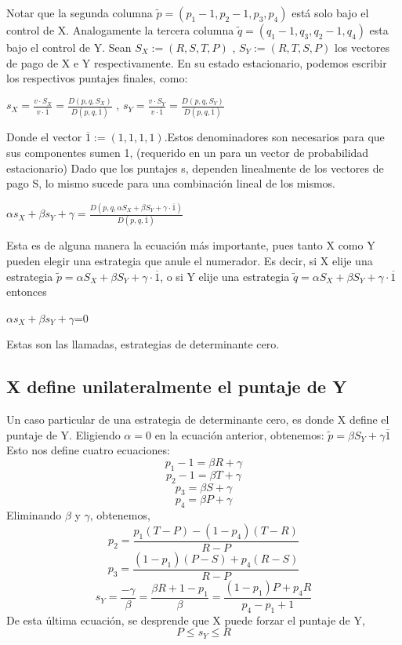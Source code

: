 \documentclass[12pt]{article}
\begin{document}
Notar que la segunda columna $\tilde{p}= (p_1-1,p_2-1,p_3,p_4)$ está solo bajo el control de X.
Analogamente la tercera columna $\tilde{q}=(q_1-1,q_3,q_2-1,q_4)$ esta bajo el control de Y.
Sean $S_X:=(R,S,T,P)$ , $S_Y:=(R,T,S,P)$ los vectores de pago de X e Y respectivamente.
En su estado estacionario, podemos escribir los respectivos puntajes finales, como:
\begin{center}
$s_X=\frac{v \cdot S_X}{v \cdot \overline1} = \frac{D(p,q,S_X)}{D(p,q,\overline1)}$ , 
$s_Y=\frac{v \cdot S_Y}{v \cdot \overline1} = \frac{D(p,q,S_Y)}{D(p,q,\overline1)}$
\end{center}
Donde el vector $\overline1:=(1,1,1,1)$.Estos denominadores son necesarios para que sus
componentes sumen 1, (requerido en un para un vector de probabilidad estacionario)
Dado que los puntajes s, dependen linealmente de los vectores de pago S, lo mismo
sucede para una combinación lineal de los mismos.
\begin{center}
 $\alpha s_X + \beta s_Y + \gamma=\frac{D(p,q,\alpha S_X + \beta S_Y + \gamma\cdot \overline1)}{D(p,q,\overline1)}$
\end{center}
Esta es de alguna manera la ecuación más importante, pues tanto X como Y pueden elegir una
estrategia que anule el numerador. Es decir, si X elije una estrategia 
$\tilde{p}= \alpha S_X + \beta S_Y + \gamma\cdot \overline1$, o si Y elije una estrategia
$\tilde{q}= \alpha S_X + \beta S_Y + \gamma\cdot \overline1$ entonces 

\begin{center}
$\alpha s_X + \beta s_Y + \gamma$=0
\end{center}
Estas son las llamadas, estrategias de determinante cero.

\subsection{X define unilateralmente el puntaje de Y}
Un caso particular de una estrategia de determinante cero, es donde X define el puntaje de Y.
Eligiendo $\alpha=0$ en la ecuación anterior, obtenemos: $\tilde{p}=\beta S_Y + \gamma \overline1$
Esto nos define cuatro ecuaciones:
$$p_1-1=\beta R + \gamma$$
$$p_2-1=\beta T + \gamma$$
$$p_3=\beta S + \gamma$$
$$p_4=\beta P + \gamma$$
Eliminando $\beta$ y $\gamma$, obtenemos,
$$p_2=\frac{p_1(T-P)-(1-p_4)(T-R)}{R-P}$$
$$p_3=\frac{(1-p_1)(P-S)+p_4(R-S)}{R-P}$$
$$s_Y=\frac{-\gamma}{\beta}=\frac{\beta R+ 1-p_1}{\beta}=\frac{(1-p_1)P+p_4 R}{p_4-p_1+1}$$
De esta última ecuación, se desprende que X puede forzar el puntaje de Y,
$$P\leq s_Y\leq R $$
\end{document}
